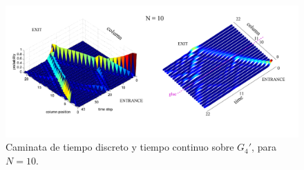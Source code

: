 \begin{figure}[ht]
\centering
\includegraphics[width=1\textwidth]{Kap4/GluedTreesCarneiro.png}
\caption{Caminata de tiempo discreto y tiempo continuo sobre $G_4'$, para $N=10$. \cite{carneiro2005entanglement}}
\end{figure}

